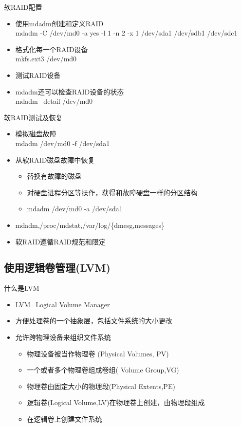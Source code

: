 \begin{frame}{软RAID配置}
\begin{itemize}
\item 使用mdadm创建和定义RAID\\
mdadm -C /dev/md0 -a yes -l 1 -n 2 -x 1 /dev/sda1 /dev/sdb1 /dev/sdc1
\item 格式化每一个RAID设备\\
mkfs.ext3 /dev/md0
\item 测试RAID设备
\item mdadm还可以检查RAID设备的状态\\
mdadm --detail /dev/md0
\end{itemize}

\end{frame} 

\begin{frame}{软RAID测试及恢复}
\begin{itemize}
\item 模拟磁盘故障\\
mdadm /dev/md0 -f /dev/sda1
\item 从软RAID磁盘故障中恢复

\begin{itemize}
\item 替换有故障的磁盘
\item 对硬盘进程分区等操作，获得和故障硬盘一样的分区结构
\item mdadm /dev/md0 -a /dev/sda1
\end{itemize}
\item mdadm,/proc/mdstat,/var/log/\{dmesg,messages\}
\item 软RAID遵循RAID规范和限定
\end{itemize}
\end{frame} 
\subsection{使用逻辑卷管理(LVM)}

\begin{frame}{什么是LVM}
\begin{itemize}
\item LVM=Logical Volume Manager
\item 方便处理卷的一个抽象层，包括文件系统的大小更改
\item 允许跨物理设备来组织文件系统

\begin{itemize}
\item 物理设备被当作物理卷 (Physical Volumes, PV)
\item 一个或者多个物理卷组成卷组( Volume Group,VG)
\item 物理卷由固定大小的物理段(Physical Extents,PE)
\item 逻辑卷(Logical Volume,LV)在物理卷上创建，由物理段组成
\item 在逻辑卷上创建文件系统
\end{itemize}
\end{itemize}
\end{frame}

